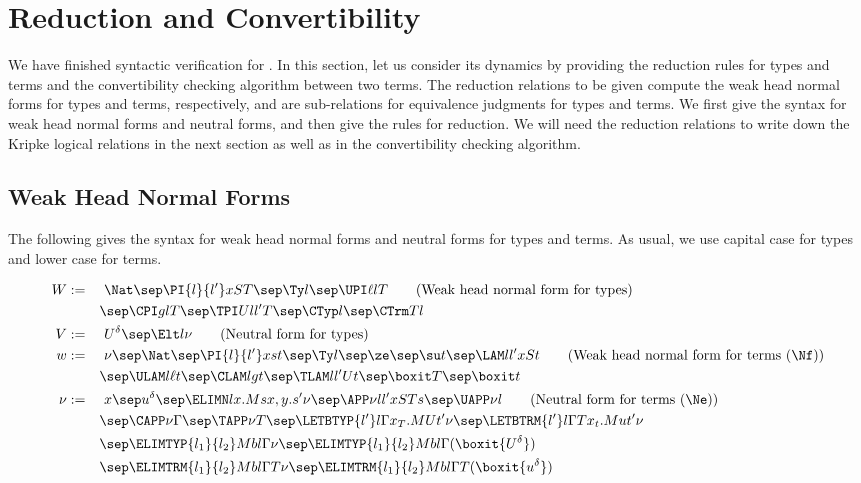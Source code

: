 \section{Reduction and Convertibility}

We have finished syntactic verification for \delamlang. %
In this section, let us consider its dynamics by providing the reduction rules for
types and terms and the convertibility checking algorithm between two terms. %
The reduction relations to be given compute the weak head normal forms for
types and terms, respectively, and are sub-relations for equivalence judgments for
types and terms. %
We first give the syntax for weak head normal forms and neutral forms, and then give
the rules for reduction. %
We will need the reduction relations to write down the Kripke logical relations in the
next section as well as in the convertibility checking algorithm. %

\subsection{Weak Head Normal Forms}

The following gives the syntax for weak head normal forms and neutral forms for types
and terms. %
As usual, we use capital case for types and lower case for terms. 

\begin{alignat*}{2}
  W &:= && \ \Nat \sep \PI{l}{l'}x S T \sep \Ty l \sep \UPI \ell l T 
           \tag{Weak head normal form for types}\\
    & &&  \sep \CPI g l T \sep \TPI U l{l'}T \sep \CTyp l \sep \CTrm T l  \\
  V & := &&\ U^\delta \sep \Elt l \nu
  \tag{Neutral form for types}\\
  w &:= &&\ \nu \sep \Nat \sep \PI{l}{l'}x s t \sep \Ty l \sep \ze \sep \su t \sep \LAM l{l'} x S t
           \tag{Weak head normal form for terms ($\Nf$)} \\
    & && \sep \ULAM l \ell t \sep \CLAM l g t \sep \TLAM l{l'} U t \sep \boxit T \sep
         \boxit t \\
  \nu &:= &&\ x \sep u^\delta \sep \ELIMN l{x.M}{s}{x, y.s'}{\nu} \sep \APP \nu l{l'} x S T
           s \sep \UAPP \nu l
           \tag{Neutral form for terms ($\Ne$)} \\
    & && \sep \CAPP \nu \Gamma \sep \TAPP \nu T \sep \LETBTYP{l'}l\Gamma{x_T. M}{U}{t'}\nu
         \sep \LETBTRM{l'}l\Gamma T{x_t. M}{u}{t'}\nu \\
    & && \sep \ELIMTYP{l_1}{l_2}Mbl\Gamma \nu \sep \ELIMTYP{l_1}{l_2}Mbl\Gamma {(\boxit
         {U^\delta})} \\
    & && \sep \ELIMTRM{l_1}{l_2}Mbl\Gamma T \nu \sep \ELIMTRM{l_1}{l_2}Mbl\Gamma T {(\boxit{u^\delta})}
\end{alignat*}

